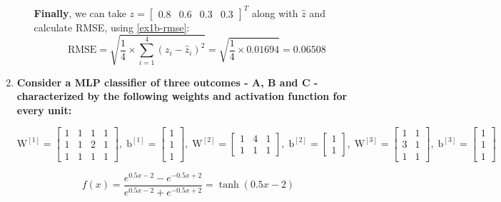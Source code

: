 \documentclass[12pt]{article}
\begin{document}
\begin{enumerate}[leftmargin=\labelsep]
\begin{enumerate}
                \textbf{Finally}, we can take $z = \begin{bmatrix}0.8 & 0.6 & 0.3 & 0.3\end{bmatrix}^T$ along with $\hat{z}$ and calculate RMSE, using \eqref{ex1b-rmse}:
                $$
                  \text{RMSE} = \sqrt{\frac{1}{4} \times \sum_{i = 1}^{4} (z_i - \hat{z}_i)^2} = \sqrt{\frac{1}{4} \times 0.01694} = \mathbf{0.06508}
                $$
        \end{enumerate}

  \item \textbf{Consider a MLP classifier of three outcomes - A, B and C - characterized by the following weights and activation function for every unit:} \\

        \begin{center}
          \vskip -0.3cm
          $\text{W}^{[1]} = \begin{bmatrix} 1 & 1 & 1 & 1 \\ 1 & 1 & 2 & 1 \\ 1 & 1 & 1 & 1\end{bmatrix},\; \text{b}^{[1]} = \begin{bmatrix} 1 \\ 1 \\ 1 \end{bmatrix},\;
            \text{W}^{[2]} = \begin{bmatrix} 1 & 4 & 1 \\ 1 & 1 & 1 \end{bmatrix},\; \text{b}^{[2]} = \begin{bmatrix} 1 \\ 1 \end{bmatrix},\;
            \text{W}^{[3]} = \begin{bmatrix} 1 & 1 \\ 3 & 1 \\ 1 & 1\end{bmatrix},\; \text{b}^{[3]} = \begin{bmatrix} 1 \\ 1 \\ 1 \end{bmatrix}$ \\
        \end{center}

        \[ f\left(x\right) = \frac{{e^{0.5x - 2} - e^{-0.5x + 2}}}{{e^{0.5x - 2} + e^{-0.5x + 2}}} = \tanh\left(0.5x - 2\right) \] \\


\end{enumerate}
\end{document}

